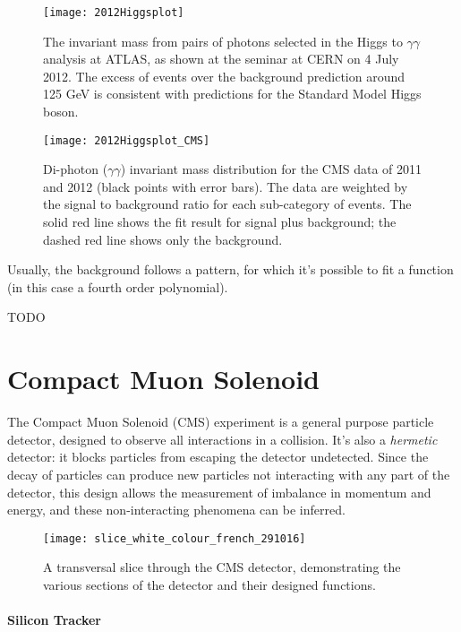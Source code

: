\begin{figure}
	\centerline{
		\texttt{[image: 2012Higgsplot]}}
	\caption{The invariant mass from pairs of photons selected in the Higgs to $\gamma\gamma$ analysis at ATLAS, as shown at the seminar at CERN on 4 July 2012. The excess of events over the background prediction around 125 GeV is consistent with predictions for the Standard Model Higgs boson.\cite{Collaboration:2627611}}
\end{figure}

\begin{figure}
	\centerline{
		\texttt{[image: 2012Higgsplot\_CMS]}}
	\caption{Di-photon ($\gamma\gamma$) invariant mass distribution for the CMS data of 2011 and 2012 (black points with error bars). The data are weighted by the signal to background ratio for each sub-category of events. The solid red line shows the fit result for signal plus background; the dashed red line shows only the background. \cite{Collaboration:1459463}}
\end{figure}


Usually, the background follows a pattern, for which it's possible to fit a function (in this case a fourth order polynomial).

TODO


\section{Compact Muon Solenoid}

The Compact Muon Solenoid (CMS) experiment is a general purpose particle detector, designed to observe all interactions in a collision. It's also a \textit{hermetic} detector: it blocks particles from escaping the detector undetected. Since the decay of particles can produce new particles not interacting with any part of the detector, this design allows the measurement of imbalance in momentum and energy, and these non-interacting phenomena can be inferred.

\begin{figure}
	\centerline{
		\texttt{[image: slice\_white\_colour\_french\_291016]}}
	\caption{A transversal slice through the CMS detector, demonstrating the various sections of the detector
		and their designed functions. \cite{Barney:2628641}}
	\label{fig:cms2}
\end{figure}

\paragraph{Silicon Tracker}

